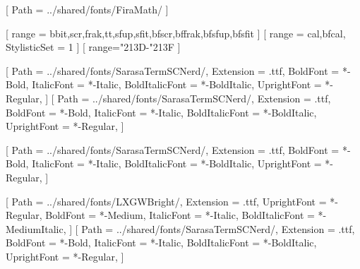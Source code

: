 

[
    Path = ../shared/fonts/FiraMath/
]


[ %
    range = {bbit,scr,frak,tt,sfup,sfit,bfscr,bffrak,bfsfup,bfsfit}
]
[ %
    range = {cal,bfcal},
    StylisticSet = 1
]
[ %
    range={"213D-"213F} %
]


\usepackage{fontspec}
\setmainfont{SarasaTermSCNerd}[ %
    Path = ../shared/fonts/SarasaTermSCNerd/,
    Extension = .ttf,
    BoldFont = *-Bold,
    ItalicFont = *-Italic,
    BoldItalicFont = *-BoldItalic,
    UprightFont = *-Regular,
]
\setsansfont{SarasaTermSCNerd}[
    Path = ../shared/fonts/SarasaTermSCNerd/,
    Extension = .ttf,
    BoldFont = *-Bold,
    ItalicFont = *-Italic,
    BoldItalicFont = *-BoldItalic,
    UprightFont = *-Regular,
]

\setmonofont{SarasaTermSCNerd}[
    Path = ../shared/fonts/SarasaTermSCNerd/,
    Extension = .ttf,
    BoldFont = *-Bold,
    ItalicFont = *-Italic,
    BoldItalicFont = *-BoldItalic,
    UprightFont = *-Regular,
]

\usepackage{xeCJK}
[
    Path = ../shared/fonts/LXGWBright/,
    Extension = .ttf,
    UprightFont = *-Regular,
    BoldFont = *-Medium,
    ItalicFont = *-Italic,
    BoldItalicFont = *-MediumItalic,
]
[
    Path = ../shared/fonts/SarasaTermSCNerd/,
    Extension = .ttf,
    BoldFont = *-Bold,
    ItalicFont = *-Italic,
    BoldItalicFont = *-BoldItalic,
    UprightFont = *-Regular,
]

